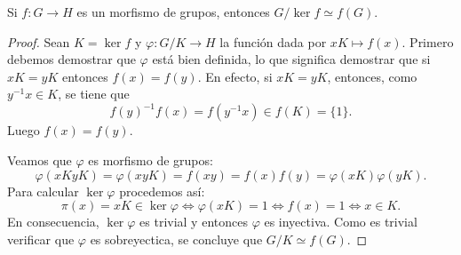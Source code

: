 	


\begin{theorem}
Si $f\colon G\to H$ es un morfismo de grupos, entonces $G/\ker f\simeq f(G)$. 
\end{theorem}

\begin{proof}	
	Sean $K=\ker f$ y $\varphi\colon G/K\to H$ la función dada por $xK\mapsto f(x)$. Primero debemos demostrar que $\varphi$ está bien definida, lo que significa 
	demostrar que si $xK=yK$ entonces $f(x)=f(y)$. En efecto, si $xK=yK$, entonces, como $y^{-1}x\in K$, se tiene que
	\[
	f(y)^{-1}f(x)=f(y^{-1}x)\in f(K)=\{1\}.
	\]
	Luego $f(x)=f(y)$. 
		
	Veamos que $\varphi$ es morfismo de grupos:
	\[
	\varphi(xKyK)=\varphi(xyK)=f(xy)=f(x)f(y)=\varphi(xK)\varphi(yK).
	\]
	Para calcular $\ker\varphi$ procedemos así: 
	\[
	\pi(x)=xK\in\ker\varphi\Longleftrightarrow \varphi(xK)=1
	\Longleftrightarrow f(x)=1
	\Longleftrightarrow x\in K.
	\]
	En consecuencia,  $\ker\varphi$ es trivial y entonces $\varphi$ es inyectiva. Como es trivial verificar que $\varphi$ es sobreyectica, 
	se concluye que $G/K\simeq f(G)$. 
\end{proof}

